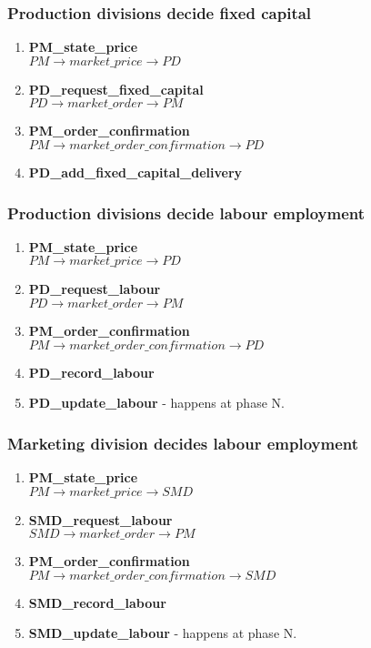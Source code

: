 \documentclass[11pt]{article}
\begin{document}
\subsubsection{Production divisions decide fixed capital}
\begin{enumerate}
	\item \textbf{PM\_state\_price} \\
	$ PM \rightarrow market\_price \rightarrow PD $
	\item \textbf{PD\_request\_fixed\_capital} \\
	$ PD \rightarrow market\_order \rightarrow PM $
	\item \textbf{PM\_order\_confirmation} \\
	$ PM \rightarrow market\_order\_confirmation \rightarrow PD $
	\item \textbf{PD\_add\_fixed\_capital\_delivery}
\end{enumerate}

\subsubsection{Production divisions decide labour employment}
\begin{enumerate}
	\item \textbf{PM\_state\_price} \\
	$ PM \rightarrow market\_price \rightarrow PD $
	\item \textbf{PD\_request\_labour} \\
	$ PD \rightarrow market\_order \rightarrow PM $
	\item \textbf{PM\_order\_confirmation} \\
	$ PM \rightarrow market\_order\_confirmation \rightarrow PD $
	\item \textbf{PD\_record\_labour}
	\item \textbf{PD\_update\_labour} - happens at phase N.
\end{enumerate}

\subsubsection{Marketing division decides labour employment}
\begin{enumerate}
	\item \textbf{PM\_state\_price} \\
	$ PM \rightarrow market\_price \rightarrow SMD $
	\item \textbf{SMD\_request\_labour} \\
	$ SMD \rightarrow market\_order \rightarrow PM $
	\item \textbf{PM\_order\_confirmation} \\
	$ PM \rightarrow market\_order\_confirmation \rightarrow SMD $
	\item \textbf{SMD\_record\_labour}
	\item \textbf{SMD\_update\_labour} - happens at phase N.
\end{enumerate}
\end{document}
